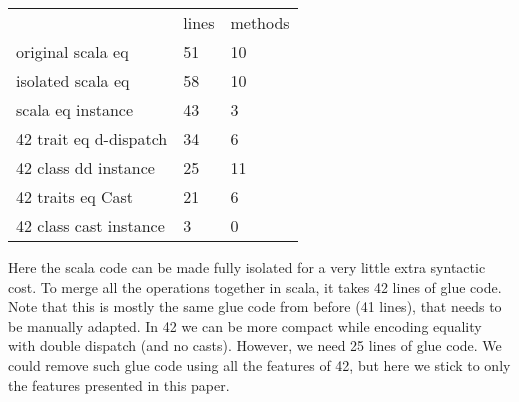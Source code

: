 \begin{minipage}{0.4\textwidth}
\begin{tabular}{l |l |l}
&                              lines  &   methods\\
original scala eq           &    51   &   10\\
isolated scala eq           &   58    &   10\\
scala eq instance           &    43   &    3\\
42 trait eq d-dispatch      &    34   &    6\\
42 class dd instance        &    25   &   11\\
42 traits eq Cast            &    21   &    6\\
42 class cast instance      &     3   &    0\\
\end{tabular}
\end{minipage}
\begin{minipage}{0.6\textwidth}
Here the scala code can be made fully isolated for a very little
extra syntactic cost.
To merge all the operations together in scala, it
takes 42 lines of glue code. Note that this
is mostly the same glue code from before (41 lines), that
needs to be manually adapted.
In 42 we can be more compact while encoding equality with double dispatch (and no casts).
However, we need 25 lines of glue code.
We could remove such glue code using all 
the features
of 42, but here we stick to only the features presented in this paper.
\end{minipage}


